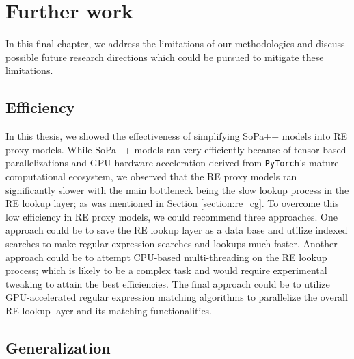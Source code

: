 \chapter{Further work}

\label{chapter:further_work}

In this final chapter, we address the limitations of our methodologies and
discuss possible future research directions which could be pursued to mitigate
these limitations.

\section{Efficiency}

In this thesis, we showed the effectiveness of simplifying SoPa++ models into RE
proxy models. While SoPa++ models ran very efficiently because of tensor-based
parallelizations and GPU hardware-acceleration derived from \texttt{PyTorch}'s
mature computational ecosystem, we observed that the RE proxy models ran
significantly slower with the main bottleneck being the slow lookup process in
the RE lookup layer; as was mentioned in Section \ref{section:re_cg}. To
overcome this low efficiency in RE proxy models, we could recommend three
approaches. One approach could be to save the RE lookup layer as a data base and
utilize indexed searches to make regular expression searches and lookups much
faster. Another approach could be to attempt CPU-based multi-threading on the RE
lookup process; which is likely to be a complex task and would require
experimental tweaking to attain the best efficiencies. The final approach could
be to utilize GPU-accelerated regular expression matching algorithms
\citep{wang2011gregex,zu2012gpu,yu2013gpu} to parallelize the overall RE lookup
layer and its matching functionalities.

\section{Generalization}

